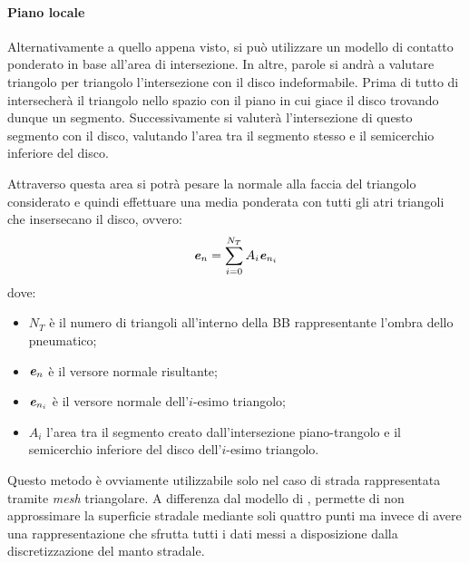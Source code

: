 \paragraph{Piano locale}
Alternativamente a quello appena visto, si può utilizzare un modello di contatto ponderato in base all'area di intersezione. In altre, parole si andrà a valutare triangolo per triangolo l'intersezione con il disco indeformabile. Prima di tutto di intersecherà il triangolo nello spazio con il piano in cui giace il disco trovando dunque un segmento. Successivamente si valuterà l'intersezione di questo segmento con il disco, valutando l'area tra il segmento stesso e il semicerchio inferiore del disco.


Attraverso questa area si potrà pesare la normale alla faccia del triangolo considerato e quindi effettuare una media ponderata con tutti gli atri triangoli che insersecano il disco, ovvero:
%
\begin{equation}
\textbf{\textit{e}}_n = \sum_{i=0}^{N_T}A_i\textbf{\textit{e}}_{n_i}
\label{ponderata}
\end{equation}
%
dove:
\begin{itemize}
	\item $N_T$ è il numero di triangoli all'interno della \ac{BB} rappresentante l'ombra dello pneumatico;
	\item $\textbf{\textit{e}}_n$ è il versore normale risultante;
	\item $\textbf{\textit{e}}_{n_i}$ è il versore normale dell'$i$-esimo triangolo;
	\item $A_i$ l'area tra il segmento creato dall'intersezione piano-trangolo e il semicerchio inferiore del disco dell'$i$-esimo triangolo.
\end{itemize}

Questo metodo è ovviamente utilizzabile solo nel caso di strada rappresentata tramite \textit{mesh} triangolare. A differenza dal modello di \cite{Rill}, permette di non approssimare la superficie stradale mediante soli quattro punti ma invece di avere una rappresentazione che sfrutta tutti i dati messi a disposizione dalla discretizzazione del manto stradale.
%
